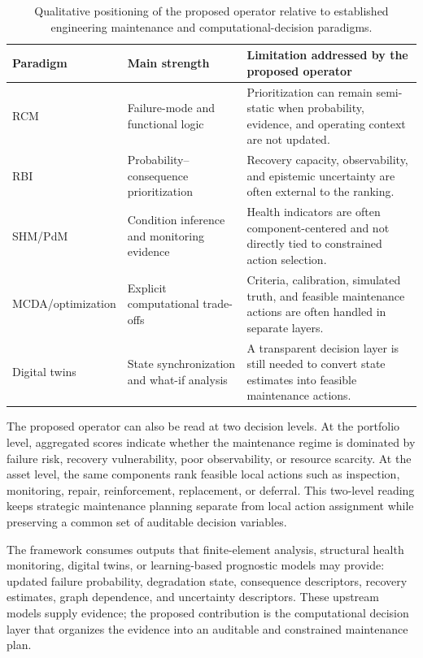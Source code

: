 \documentclass[cmes,article,submit,moreauthors,pdftex]{Definitions/tsp}
\begin{document}
\begin{table}[H]
\centering
\scriptsize
\caption{Qualitative positioning of the proposed operator relative to established engineering maintenance and computational-decision paradigms.}
\label{tab:paradigm-gap}
\begin{tabular*}{\textwidth}{@{\extracolsep{\fill}}>{\raggedright\arraybackslash}p{}>{\raggedright\arraybackslash}p{}>{\raggedright\arraybackslash}p{}}
\toprule
Paradigm & Main strength & Limitation addressed by the proposed operator \\
\midrule
RCM & Failure-mode and functional logic & Prioritization can remain semi-static when probability, evidence, and operating context are not updated. \\
RBI & Probability--consequence prioritization & Recovery capacity, observability, and epistemic uncertainty are often external to the ranking. \\
SHM/PdM & Condition inference and monitoring evidence & Health indicators are often component-centered and not directly tied to constrained action selection. \\
MCDA/optimization & Explicit computational trade-offs & Criteria, calibration, simulated truth, and feasible maintenance actions are often handled in separate layers. \\
Digital twins & State synchronization and what-if analysis & A transparent decision layer is still needed to convert state estimates into feasible maintenance actions. \\
\bottomrule
\end{tabular*}
\end{table}

The proposed operator can also be read at two decision levels. At the portfolio level, aggregated scores indicate whether the maintenance regime is dominated by failure risk, recovery vulnerability, poor observability, or resource scarcity. At the asset level, the same components rank feasible local actions such as inspection, monitoring, repair, reinforcement, replacement, or deferral. This two-level reading keeps strategic maintenance planning separate from local action assignment while preserving a common set of auditable decision variables.

The framework consumes outputs that finite-element analysis, structural health monitoring, digital twins, or learning-based prognostic models may provide: updated failure probability, degradation state, consequence descriptors, recovery estimates, graph dependence, and uncertainty descriptors. These upstream models supply evidence; the proposed contribution is the computational decision layer that organizes the evidence into an auditable and constrained maintenance plan.
\end{document}
